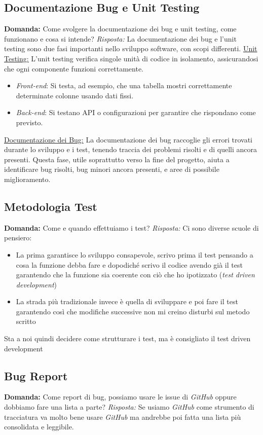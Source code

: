 \documentclass{article}
\begin{document}
\subsection{Documentazione Bug e Unit Testing}
\textbf{Domanda:} Come svolgere la documentazione dei bug e unit testing, come funzionano e cosa si intende?
\newline
\textit{Risposta:} La documentazione dei bug e l'unit testing sono due fasi importanti nello sviluppo software, con scopi differenti.
\newline
\underline{Unit Testing:}  
L'unit testing verifica singole unità di codice in isolamento, assicurandosi che ogni componente funzioni correttamente.  
\begin{itemize}
    \item \textit{Front-end}: Si testa, ad esempio, che una tabella mostri correttamente determinate colonne usando dati fissi.
    \item \textit{Back-end}: Si testano API o configurazioni per garantire che rispondano come previsto.
\end{itemize}
\underline{Documentazione dei Bug:}  
La documentazione dei bug raccoglie gli errori trovati durante lo sviluppo e i test, tenendo traccia dei problemi risolti e di quelli ancora presenti. Questa fase, utile soprattutto verso la fine del progetto, aiuta a identificare bug risolti, bug minori ancora presenti, e aree di possibile miglioramento.
\subsection{Metodologia Test}
\textbf{Domanda:} Come e quando effettuiamo i test?
\newline
\textit{Risposta:} Ci sono diverse scuole di pensiero:
\begin{itemize}
    \item La prima garantisce lo sviluppo consapevole, scrivo prima il test pensando a cosa la funzione debba fare e dopodiché scrivo il codice avendo già il test garantendo che la funzione sia coerente con ciò che ho ipotizzato (\textit{test driven development})
    \item La strada più tradizionale invece è quella di sviluppare e poi fare il test garantendo così che modifiche successive non mi creino disturbi sul metodo scritto
\end{itemize}
Sta a noi quindi decidere come strutturare i test, ma è consigliato il test driven development
\subsection{Bug Report}
\textbf{Domanda:} Come report di bug, possiamo usare le issue di \textit{GitHub} oppure dobbiamo fare una lista a parte?
\newline
\textit{Risposta:} Se usiamo \textit{GitHub} come strumento di tracciatura va molto bene usare \textit{GitHub} ma andrebbe poi fatta una lista più consolidata e leggibile.
\end{document}
